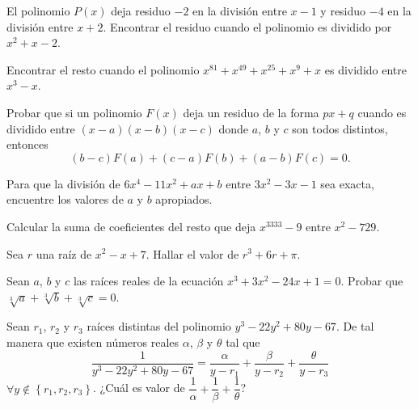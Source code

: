 \begin{section-problem}
    El polinomio $P(x)$ deja residuo $-2$ en la división entre $x - 1$ y residuo $-4$ en la división entre $x + 2$.
    Encontrar el residuo cuando el polinomio es dividido por $x^2 + x - 2$.
\end{section-problem}

\begin{section-problem}
    Encontrar el resto cuando el polinomio $x^{81} + x^{49} + x^{25} + x^9 + x$ es dividido entre $x^3 - x$.
\end{section-problem}

\begin{section-problem}
    Probar que si un polinomio $F(x)$ deja un residuo de la forma $px + q$ cuando es dividido entre $(x - a)(x - b)(x - c)$
    donde $a$, $b$ y $c$ son todos distintos, entonces
    \[(b - c)F(a) + (c - a)F(b) + (a - b)F(c) = 0.\]
\end{section-problem}

\begin{section-problem}
    Para que la división de $6x^4 - 11x^2 + ax + b$ entre $3x^2 - 3x - 1$ sea exacta, encuentre los valores de $a$ y $b$ apropiados.
\end{section-problem}

\begin{section-problem}
    Calcular la suma de coeficientes del resto que deja $x^{3333} - 9$ entre $x^2 - 729$.
\end{section-problem}

\begin{section-problem}
    Sea $r$ una raíz de $x^2 - x + 7$.
    Hallar el valor de $r^3 + 6r + \pi$.
\end{section-problem}

\begin{section-problem}
    Sean $a$, $b$ y $c$ las raíces reales de la ecuación $x^3 + 3x^2 - 24x + 1 = 0$.
    Probar que $\sqrt[3]{a} + \sqrt[3]{b} + \sqrt[3]{c} = 0$.
\end{section-problem}

\begin{section-problem}
    Sean $r_1$, $r_2$ y $r_3$ raíces distintas del polinomio $y^3 - 22 y^2 + 80 y - 67$.
    De tal manera que existen números reales $\alpha$, $\beta$ y $\theta$ tal que
    \[\frac{1}{y^3 - 22 y^2 + 80 y - 67} = \frac{\alpha}{y - r_1} + \frac{\beta}{y - r_2} + \frac{\theta}{y - r_3}\]
    $\forall y \notin \left\{ r_1, r_2, r_3 \right\}$.
    ¿Cuál es valor de $\dfrac{1}{\alpha} + \dfrac{1}{\beta} + \dfrac{1}{\theta}$?
\end{section-problem}

